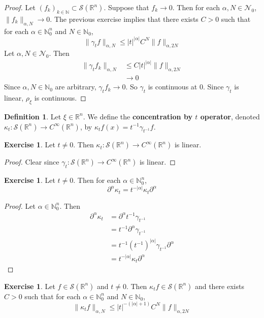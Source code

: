 \documentclass{book}
\theoremstyle{definition}
\newtheorem{defn}[definition]{Definition}
\newtheorem{ex}[definition]{Exercise}
\newcommand{\al}{\alpha}
\newcommand{\gam}{\gamma}
\newcommand{\kap}{\kappa}
\newcommand{\N}{\mathbb{N}}
\newcommand{\R}{\mathbb{R}}
\newcommand{\MN}{\mathcal{N}}
\newcommand{\MS}{\mathcal{S}}
\DeclareMathOperator*{\0}{\mbf{0}}
\DeclareMathOperator*{\1}{\mbf{1}}
\newcommand{\p}{\partial}
\begin{document}
	\begin{proof} 
		Let $(f_k)_{k \in \N} \subset \MS(\R^n)$. Suppose that $f_k \rightarrow 0$. Then for each $\al,N \in \MN_0$, $\|f_k\|_{\al, N} \rightarrow 0$. The previous exercise implies that  there exists $C > 0$ such that for each $\al \in \N_0^n$ and $N \in \N_0$, 
		$$\| \gam_t f\|_{\al, N} \leq |t|^{|\al|} C^N\|f\|_{\al, 2N}$$ 
		Let $\al,N \in \MN_0$. Then 
		\begin{align*}
			\|\gam_tf_k\|_{\al, N} 
			& \leq C |t|^{|\al|} \|f\|_{\al, 2N} \\
			& \rightarrow 0
		\end{align*}
		Since $\al, N \in \N_0$ are arbitrary, $\gam_t f_k \rightarrow 0$. So $\gam_t$  is continuous at $0$. Since $\gam_t$ is linear, $\rho_{\xi}$ is continuous.
	\end{proof}

	\begin{defn}
		Let $\xi \in \R^n$. We define the \textbf{concentration by $t$ operator}, denoted $\kap_t: \MS(\R^n) \rightarrow C^{\infty}(\R^n)$, by $\kap_t f(x) = t^{-1} \gam_{t^{-1}} f$.
	\end{defn}

	\begin{ex}
		Let $t \neq 0$. Then $\kap_t: \MS(\R^n) \rightarrow C^{\infty}(\R^n)$ is linear.
	\end{ex}
	
	\begin{proof}
		Clear since $\gam_t: \MS(\R^n) \rightarrow C^{\infty}(\R^n)$ is linear.
	\end{proof}
	
	\begin{ex}
		Let $t \neq 0$. Then for each $\al \in \N_0^n$,  
		$$\p^{\al} \kap_t = t^{-|\al|} \kap_t \p^{\al} $$
	\end{ex}
	
	\begin{proof}
		Let $\al \in \N_0^n$. Then 
		\begin{align*}
			\p^{\al} \kap_t 
			& = \p^{\al} t^{-1} \gam_{t^{-1}} \\
			& = t^{-1} \p^{\al} \gam_{t^{-1}} \\
			& = t^{-1} (t^{-1})^{|\al|} \gam_{t^{-1}} \p^{\al} \\
			& = t^{-|\al|} \kap_{t} \p^{\al}
		\end{align*}
	\end{proof}
	
	\begin{ex}
		Let $f \in \MS(\R^n)$ and $t \neq 0$. Then $ \kap_t f \in \MS(\R^n)$ and there exists $C > 0$ such that for each $\al \in \N_0^n$ and $N \in \N_0$, 
		$$\| \kap_t f\|_{\al, N} \leq |t|^{-(|\al|+1)} C^N\|f\|_{\al, 2N}$$
	\end{ex}
	
\end{document}

